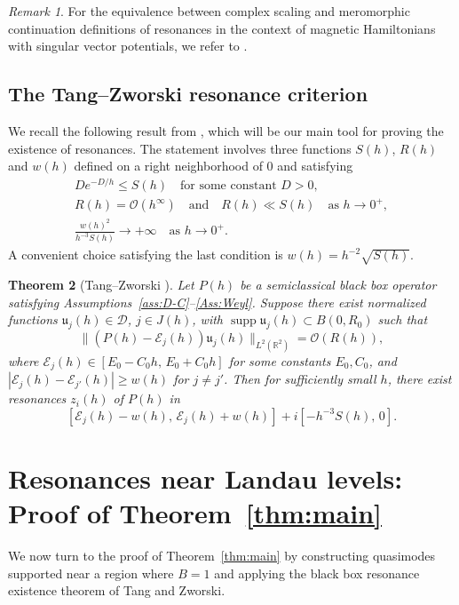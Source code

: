 \documentclass[11pt]{amsart}
\newtheorem{theorem}{Theorem}[section]
\theoremstyle{remark}
\newtheorem{remark}[theorem]{Remark}
\newcommand{\R}{\mathbb{R}}
\numberwithin{equation}{section}
\begin{document}
%
\begin{remark}
    For the equivalence between complex scaling and meromorphic continuation definitions of resonances in the context of magnetic Hamiltonians with singular vector potentials, we refer to \cite[Section 3]{Y}.
\end{remark}




\subsection{The Tang–Zworski resonance criterion}

We recall the following result from \cite[Theorem, p.~264]{TZ}, which will be our main tool for proving the existence of resonances. 
The statement involves three functions $S(h)$, $R(h)$ and $w(h)$ defined on a right neighborhood of $0$ and satisfying
\[
\begin{gathered}
    De^{-D/h} \leq S(h) \quad\text{for some constant } D>0,\\[2mm]
    R(h) = \mathcal O(h^\infty) \quad\text{and}\quad R(h) \ll S(h) \quad\text{as } h\to0^+,\\[2mm]
    \frac{w(h)^2}{h^{-3} S(h)} \to +\infty \quad\text{as } h\to0^+.
\end{gathered}
\]
A convenient choice satisfying the last condition is $w(h) = h^{-2} \sqrt{S(h)}$.

\begin{theorem}[Tang–Zworski \cite{TZ}]\label{thm:TZ}
Let $P(h)$ be a semiclassical black box operator satisfying Assumptions~\ref{ass:D-C}--\ref{Ass:Weyl}. 
Suppose there exist normalized functions $\mathfrak u_j(h)\in \mathcal D$, $j\in J(h)$, with $\operatorname{supp} \mathfrak u_j(h)\subset B(0,R_0)$ such that
\[
\|(P(h)-\mathcal E_j(h))\mathfrak u_j(h)\|_{L^2(\R^2)} = \mathcal O(R(h)),
\]
where $\mathcal E_j(h)\in [E_0-C_0h,\,E_0+C_0h]$ for some constants $E_0,C_0$, and $|\mathcal E_j(h)-\mathcal E_{j'}(h)|\geq w(h)$ for $j\neq j'$. 
Then for sufficiently small $h$, there exist resonances $z_i(h)$ of $P(h)$ in
\[
[\mathcal E_j(h)-w(h),\,\mathcal E_j(h)+w(h)] + i[-h^{-3}S(h),\,0].
\]
\end{theorem}

\section{Resonances near Landau levels: Proof of Theorem~\ref{thm:main}}\label{sec:loc-cst}

We now turn to the  proof of Theorem~\ref{thm:main} by constructing quasimodes supported near a region where $B=1$ and applying the black box resonance existence theorem of Tang and Zworski.
\end{document}
